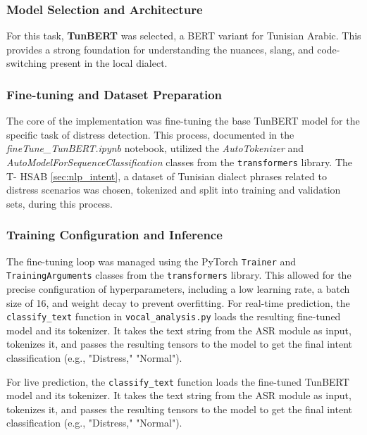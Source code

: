 \documentclass[12pt,a4paper,oneside,english]{book}
\begin{document}
{\subsubsection{Model Selection and Architecture}
For this task, \textbf{TunBERT} was selected, a BERT variant for Tunisian Arabic. This provides a strong foundation for understanding the nuances, slang, and code-switching present in the local dialect.

\subsubsection{Fine-tuning and Dataset Preparation}
The core of the implementation was fine-tuning the base TunBERT model for the specific task of distress detection. This process, documented in the \textit{fineTune\_TunBERT.ipynb} notebook, 
utilized the \textit{AutoTokenizer} and \textit{AutoModelForSequenceClassification} classes from the \texttt{transformers} library. 
The T- HSAB \ref{sec:nlp_intent}, a dataset of Tunisian dialect phrases related to distress scenarios was chosen, tokenized and split into training and validation sets, during this process. 
\subsubsection{Training Configuration and Inference}
The fine-tuning loop was managed using the PyTorch \texttt{Trainer} and \texttt{TrainingArguments} classes from the \texttt{transformers} library. This allowed for the precise configuration of hyperparameters, including a low learning rate, a batch size of 16, and weight decay to prevent overfitting. For real-time prediction, the \texttt{classify\_text} function in \texttt{vocal\_analysis.py} loads the resulting fine-tuned model and its tokenizer. It takes the text string from the ASR module as input, tokenizes it, and passes the resulting tensors to the model to get the final intent classification (e.g., "Distress," "Normal").

For live prediction, the \texttt{classify\_text} function loads the fine-tuned TunBERT model and its tokenizer. It takes the text string from the ASR module as input, tokenizes it, and passes the resulting tensors to the model to get the final intent classification (e.g., "Distress," "Normal").



}
\end{document}
